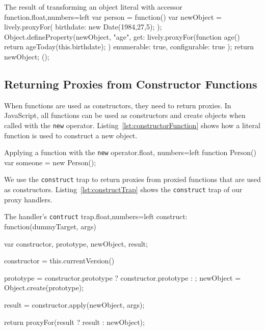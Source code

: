 \begin{code}{The result of transforming an object literal with accessor function.}{float,numbers=left}
var person = function() {
    var newObject = lively.proxyFor({
        birthdate: new Date(1984,27,5);
    });
    Object.defineProperty(newObject, "age", {
        get: lively.proxyFor(function age() {
            return ageToday(this.birthdate);
        })
        enumerable: true,
        configurable: true
    });
    return newObject;
}();
\end{code}
\iffalse
\end{verbatim}\fi



\subsection{Returning Proxies from Constructor Functions} 

When functions are used as constructors, they need to return proxies.
In JavaScript, all functions can be used as constructors and create objects when called with the \lstinline{new} operator.
Listing~\ref{lst:constructorFunction} shows how a literal function is used to construct a new object.

\begin{code}{Applying a function with the \lstinline{new} operator.}{float, numbers=left}
function Person() {}
var someone = new Person();
\end{code}
\iffalse
\end{verbatim}\fi

We use the \lstinline{construct} trap to return proxies from proxied functions that are used as constructors.
Listing~\ref{lst:constructTrap} shows the \lstinline{construct} trap of our proxy handlers.

\begin{code}{The handler's \lstinline{contruct} trap.}{float,numbers=left}
construct: function(dummyTarget, args) {
    var constructor, prototype, newObject, result;
    
    constructor = this.currentVersion()
    
    prototype = constructor.prototype ? constructor.prototype : {};
    newObject = Object.create(prototype);
    
    result = constructor.apply(newObject, args);
    
    return proxyFor(result ? result : newObject);
}
\end{code}
\iffalse
\end{verbatim}\fi

